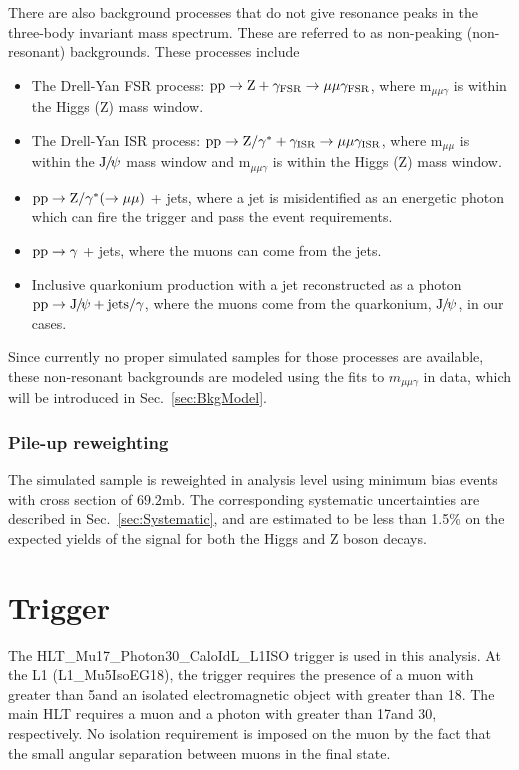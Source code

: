 There are also background processes that do not give resonance peaks in the three-body invariant mass spectrum. These are referred to as non-peaking (non-resonant) backgrounds. 
These processes include 
		\begin{itemize}
		\item The Drell-Yan FSR process: $\mathrm{p}\mathrm{p}\rightarrow \mathrm{Z}+\gamma_{\text{FSR}}\rightarrow\mu\mu\gamma_{\text{FSR}}$, where $\text{m}_{\mu\mu\gamma}$ is within the Higgs (Z) mass window.
		\item The Drell-Yan ISR process: $\mathrm{p}\mathrm{p}\rightarrow \mathrm{Z}/\gamma^{*}+\gamma_{\text{ISR}}\rightarrow\mu\mu\gamma_{\text{ISR}}$, where $\text{m}_{\mu\mu}$ is within the ${\mathrm{J}\hspace{-.08em}/\hspace{-.14em}\psi}$ mass window and $\text{m}_{\mu\mu\gamma}$ is within the Higgs (Z) mass window. 
		\item $\mathrm{p}\mathrm{p}\rightarrow \mathrm{Z}/\gamma^* (\rightarrow\mu\mu)$ + jets, where a jet is misidentified as an energetic photon which can fire the trigger and pass the event requirements.
		\item $\mathrm{p}\mathrm{p}\rightarrow\gamma$ + jets, where the muons can come from the jets.
		\item Inclusive quarkonium production with a jet reconstructed as a photon $\mathrm{p}\mathrm{p}\to {\mathrm{J}\hspace{-.08em}/\hspace{-.14em}\psi}+\text{jets}/\gamma$, where the muons come from the quarkonium, ${\mathrm{J}\hspace{-.08em}/\hspace{-.14em}\psi}$, in our cases.
		\end{itemize}
		Since currently no proper simulated samples for those processes are available, these non-resonant backgrounds are modeled using the fits to $m_{\mu\mu\gamma}$ in data, which will be introduced in Sec.~\ref{sec:BkgModel}.
		
		\subsubsection*{Pile-up reweighting}
		The simulated sample is reweighted in analysis level using minimum bias events with cross section of $69.2\text{mb}$. The corresponding systematic uncertainties are described in Sec.~\ref{sec:Systematic}, and are estimated to be less than 1.5\% on the expected yields of the signal for both the Higgs and Z boson decays.
		
		\section{Trigger}  
		The HLT\_Mu17\_Photon30\_CaloIdL\_L1ISO trigger is used in this analysis. 
		At the L1 (L1\_Mu5IsoEG18), the trigger requires the presence of a muon with \pt greater than 5\GeV and an isolated electromagnetic object with \pt greater than 18\GeV . The main HLT requires a muon and a photon with \pt greater than 17\GeV and 30\GeV, respectively.  
		No isolation requirement is imposed on the muon by the fact that the small angular separation between muons in the final state. 
